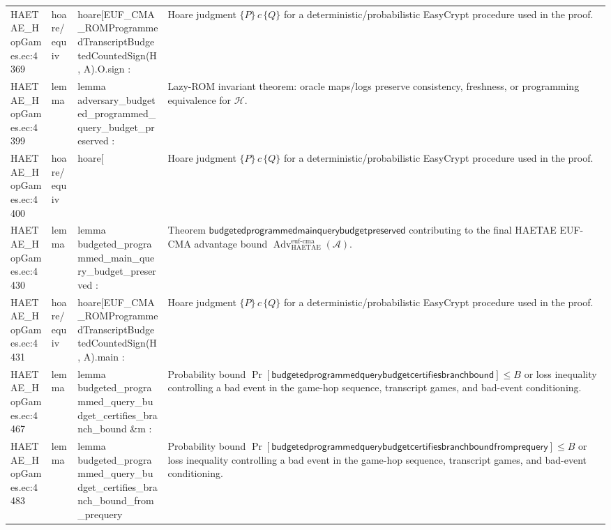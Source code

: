 \documentclass[10pt]{article}
\newcommand{\Adv}{\operatorname{Adv}}
\begin{document}
\begin{longtable}{L{0.11\textwidth}L{0.055\textwidth}L{0.385\textwidth}L{0.41\textwidth}}
HAETAE\_\allowbreak{}HopGames.\allowbreak{}ec:\allowbreak{}4369 & hoare/equiv & {\ttfamily\scriptsize hoare[EUF\_\allowbreak{}CMA\_\allowbreak{}ROMProgrammedTranscriptBudgetedCountedSign(H, A).O.sign :} & Hoare judgment $\{P\}\,c\,\{Q\}$ for a deterministic/probabilistic EasyCrypt procedure used in the proof. \\
HAETAE\_\allowbreak{}HopGames.\allowbreak{}ec:\allowbreak{}4399 & lemma & {\ttfamily\scriptsize lemma adversary\_\allowbreak{}budgeted\_\allowbreak{}programmed\_\allowbreak{}query\_\allowbreak{}budget\_\allowbreak{}preserved :} & Lazy-ROM invariant theorem: oracle maps/logs preserve consistency, freshness, or programming equivalence for $\mathcal H$. \\
HAETAE\_\allowbreak{}HopGames.\allowbreak{}ec:\allowbreak{}4400 & hoare/equiv & {\ttfamily\scriptsize hoare[} & Hoare judgment $\{P\}\,c\,\{Q\}$ for a deterministic/probabilistic EasyCrypt procedure used in the proof. \\
HAETAE\_\allowbreak{}HopGames.\allowbreak{}ec:\allowbreak{}4430 & lemma & {\ttfamily\scriptsize lemma budgeted\_\allowbreak{}programmed\_\allowbreak{}main\_\allowbreak{}query\_\allowbreak{}budget\_\allowbreak{}preserved :} & Theorem $\mathsf{budgetedprogrammedmainquerybudgetpreserved}$ contributing to the final HAETAE EUF-CMA advantage bound $\Adv_{\mathrm{HAETAE}}^{\mathrm{euf\mbox{-}cma}}(\mathcal A)$. \\
HAETAE\_\allowbreak{}HopGames.\allowbreak{}ec:\allowbreak{}4431 & hoare/equiv & {\ttfamily\scriptsize hoare[EUF\_\allowbreak{}CMA\_\allowbreak{}ROMProgrammedTranscriptBudgetedCountedSign(H, A).main :} & Hoare judgment $\{P\}\,c\,\{Q\}$ for a deterministic/probabilistic EasyCrypt procedure used in the proof. \\
HAETAE\_\allowbreak{}HopGames.\allowbreak{}ec:\allowbreak{}4467 & lemma & {\ttfamily\scriptsize lemma budgeted\_\allowbreak{}programmed\_\allowbreak{}query\_\allowbreak{}budget\_\allowbreak{}certifies\_\allowbreak{}branch\_\allowbreak{}bound \&m :} & Probability bound $\Pr[\mathsf{budgetedprogrammedquerybudgetcertifiesbranchbound}]\le B$ or loss inequality controlling a bad event in the game-hop sequence, transcript games, and bad-event conditioning. \\
HAETAE\_\allowbreak{}HopGames.\allowbreak{}ec:\allowbreak{}4483 & lemma & {\ttfamily\scriptsize lemma budgeted\_\allowbreak{}programmed\_\allowbreak{}query\_\allowbreak{}budget\_\allowbreak{}certifies\_\allowbreak{}branch\_\allowbreak{}bound\_\allowbreak{}from\_\allowbreak{}prequery} & Probability bound $\Pr[\mathsf{budgetedprogrammedquerybudgetcertifiesbranchboundfromprequery}]\le B$ or loss inequality controlling a bad event in the game-hop sequence, transcript games, and bad-event conditioning. \\

\end{longtable}
\end{document}
